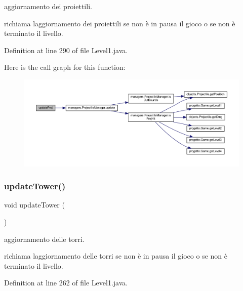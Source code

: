 aggiornamento dei proiettili. 

richiama l\textquotesingle{}aggiornamento dei proiettili se non è in pausa il gioco o se non è terminato il livello. 

Definition at line 290 of file Level1.\+java.

Here is the call graph for this function\+:
\nopagebreak
\begin{figure}[H]
\begin{center}
\leavevmode
\includegraphics[width=350pt]{classscenes_1_1_level1_ac83c203b559f6fd0bb225744d7ccf854_cgraph}
\end{center}
\end{figure}
\mbox{\label{classscenes_1_1_level1_ae4fd4a959e4d782a5e7ac0eff77ba27f}} 
\subsubsection{\texorpdfstring{update\+Tower()}{updateTower()}}
{\footnotesize\ttfamily void update\+Tower (\begin{DoxyParamCaption}{ }\end{DoxyParamCaption})}



aggiornamento delle torri. 

richiama l\textquotesingle{}aggiornamento delle torri se non è in pausa il gioco o se non è terminato il livello. 

Definition at line 262 of file Level1.\+java.

